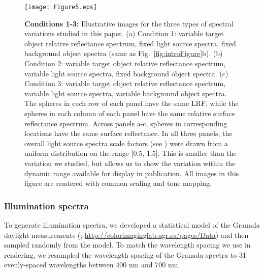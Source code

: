\documentclass{jov}
\begin{document}
\begin{figure}
\centering
\texttt{[image: Figure5.eps]}        
    \caption{{\bf Conditions 1-3:} Illustrative images for the three types of spectral variations studied in this paper. (a) Condition 1: variable target object relative reflectance spectrum, fixed light source spectra, fixed background object spectra (same as Fig.~\ref{fig:introFigure}b). 
(b) Condition 2: variable target object relative reflectance spectrum, variable light source spectra, fixed background object spectra. (c) Condition 3: variable target object relative reflectance spectrum, variable light source spectra, variable background object spectra. The spheres in each row of each panel have the same LRF, while the spheres in each column of each panel have the same relative surface reflectance spectrum.  Across panels a-c, spheres in corresponding locations have the same surface reflectance. In all three panels, the overall light source spectra scale factors (see ) were drawn from a uniform distribution on the range [0.5, 1.5]. This is smaller than the variation we studied, but allows us to show the variation within the dynamic range available for display in publication. All images in this figure are rendered with common scaling and tone mapping.} 
\label{fig:studiedCases}
\end{figure}

\subsubsection{Illumination spectra}
To generate illumination spectra, we developed a statistical model of the Granada daylight measurements (; \href{http://colorimaginglab.ugr.es/pages/Data}{http://colorimaginglab.ugr.es/pages/Data}) and then sampled randomly from the model.
To match the wavelength spacing we use in rendering, we resampled the wavelength spacing of the Granada spectra to
31 evenly-spaced wavelengths between 400 nm and 700 nm.
\end{document}

